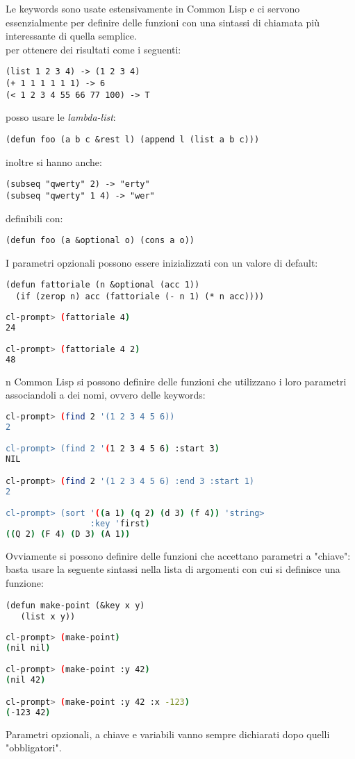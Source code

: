 \documentclass[a4paper,12pt, oneside]{book}
\begin{document}
Le keywords sono usate estensivamente in Common Lisp e ci
servono essenzialmente per definire delle funzioni con una
sintassi di chiamata più interessante di quella semplice.\\
per ottenere dei risultati come i seguenti:
\begin{verbatim}
(list 1 2 3 4) -> (1 2 3 4)
(+ 1 1 1 1 1 1) -> 6
(< 1 2 3 4 55 66 77 100) -> T
\end{verbatim}
posso usare le \textit{lambda-list}:
\begin{verbatim}
(defun foo (a b c &rest l) (append l (list a b c)))
\end{verbatim}
inoltre si hanno anche:
\begin{verbatim}
(subseq "qwerty" 2) -> "erty"
(subseq "qwerty" 1 4) -> "wer"
\end{verbatim}
definibili con:
\begin{verbatim}
(defun foo (a &optional o) (cons a o))
\end{verbatim}
I parametri opzionali possono essere inizializzati con un valore di default:
\begin{verbatim}
(defun fattoriale (n &optional (acc 1))
  (if (zerop n) acc (fattoriale (- n 1) (* n acc))))
\end{verbatim}
\begin{shaded}
\begin{lstlisting}[language=bash]
cl-prompt> (fattoriale 4)
24

cl-prompt> (fattoriale 4 2)
48
\end{lstlisting}
\end{shaded}
n Common Lisp si possono definire delle funzioni che utilizzano i loro parametri
associandoli a dei nomi, ovvero delle keywords:
\begin{shaded}
\begin{lstlisting}[language=bash]
cl-prompt> (find 2 '(1 2 3 4 5 6))
2

cl-prompt> (find 2 '(1 2 3 4 5 6) :start 3)
NIL

cl-prompt> (find 2 '(1 2 3 4 5 6) :end 3 :start 1)
2

cl-prompt> (sort '((a 1) (q 2) (d 3) (f 4)) 'string>
                 :key 'first)
((Q 2) (F 4) (D 3) (A 1))
\end{lstlisting}
\end{shaded}
Ovviamente si possono definire delle funzioni che accettano parametri a "chiave": basta usare la seguente
sintassi nella lista di argomenti con cui si definisce una funzione:
\begin{verbatim}
(defun make-point (&key x y)
   (list x y))
\end{verbatim}
\begin{shaded}
\begin{lstlisting}[language=bash]
cl-prompt> (make-point)
(nil nil)

cl-prompt> (make-point :y 42)
(nil 42)

cl-prompt> (make-point :y 42 :x -123)
(-123 42)
\end{lstlisting}
\end{shaded}
Parametri opzionali, a chiave e variabili vanno sempre dichiarati dopo quelli "obbligatori".\\
\end{document}
